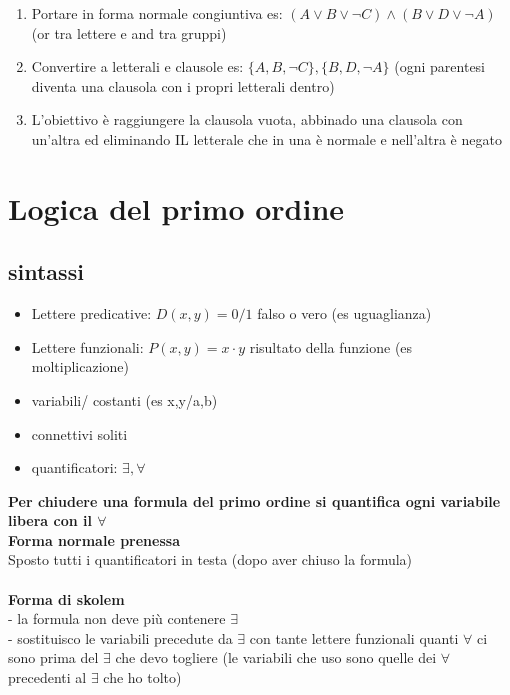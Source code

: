 \documentclass{article}
\begin{document}
\begin{multicols*}{3}
 		\begin{enumerate}
 			\setlength\itemsep{0.1mm}
 			\item Portare in forma normale congiuntiva es: \( (A\lor B \lor \neg C) \land (B \lor D \lor \neg A)\) (or tra lettere e and tra gruppi)
 			\item Convertire a letterali e clausole es: \( \{A,B,\neg C\},\{B,D,\neg A\}\) (ogni parentesi diventa una clausola con i propri letterali dentro)
 			\item L'obiettivo è raggiungere la clausola vuota, abbinado una clausola con un'altra ed eliminando IL letterale che in una è normale e nell'altra è negato
 		\end{enumerate}
 	 	
 	 	\section{Logica del primo ordine}
 	 	
 		\subsection{sintassi}
 		\begin{itemize}
 			\setlength\itemsep{0.1mm}
 			\item Lettere predicative: \(D(x,y) = 0/1\) falso o vero (es uguaglianza)
 			\item Lettere funzionali: \(P(x,y) = x\cdot y\) risultato della funzione (es moltiplicazione)
 			\item variabili/ costanti (es x,y/a,b)
 			\item connettivi soliti
 			\item quantificatori: \(\exists, \forall\)
 		\end{itemize}
 		\textbf{Per chiudere una formula del primo ordine si quantifica ogni variabile libera con il \(\forall\)}\\
 		\textbf{Forma normale prenessa}\\
 		Sposto tutti i quantificatori in testa (dopo aver chiuso la formula)\\\\
 		\textbf{Forma di skolem}\\
 		- la formula non deve più contenere \(\exists\)\\
 		- sostituisco le variabili precedute da \(\exists\) con tante lettere funzionali quanti \(\forall\) ci sono prima del \(\exists\) che devo togliere (le variabili che uso sono quelle dei \(\forall\) precedenti al \(\exists\) che ho tolto)\\

\end{multicols*}
\end{document}
